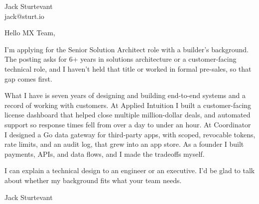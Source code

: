 \documentclass[11pt]{article}
\begin{document}
\raggedright

{\namefont\fontsize{20pt}{24pt}\selectfont Jack Sturtevant}\\[-0.3em]
jack@sturt.io

\vspace{1.2em}

Hello MX Team,

I'm applying for the Senior Solution Architect role with a builder's background. The posting asks for 6+ years in solutions architecture or a customer-facing technical role, and I haven't held that title or worked in formal pre-sales, so that gap comes first.

What I have is seven years of designing and building end-to-end systems and a record of working with customers. At Applied Intuition I built a customer-facing license dashboard that helped close multiple million-dollar deals, and automated support so response times fell from over a day to under an hour. At Coordinator I designed a Go data gateway for third-party apps, with scoped, revocable tokens, rate limits, and an audit log, that grew into an app store. As a founder I built payments, APIs, and data flows, and I made the tradeoffs myself.

I can explain a technical design to an engineer or an executive. I'd be glad to talk about whether my background fits what your team needs.

\vspace{0.6em}
Jack Sturtevant
\end{document}
